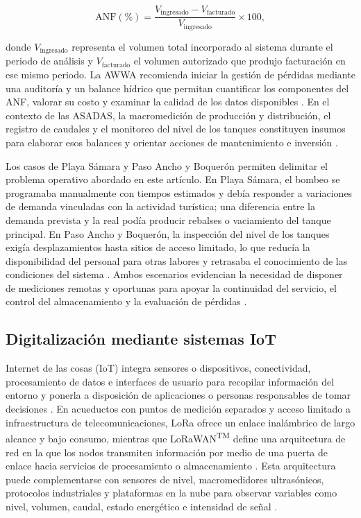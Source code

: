 \documentclass[12pt,letterpaper]{article}
\begin{document}
\begin{equation}
  \mathrm{ANF}(\%)=\frac{V_{\text{ingresado}}-V_{\text{facturado}}}{V_{\text{ingresado}}}\times 100,
  \label{eq:anf}
\end{equation}

donde $V_{\text{ingresado}}$ representa el volumen total incorporado al sistema durante el periodo de análisis y $V_{\text{facturado}}$ el volumen autorizado que produjo facturación en ese mismo periodo. La AWWA recomienda iniciar la gestión de pérdidas mediante una auditoría y un balance hídrico que permitan cuantificar los componentes del ANF, valorar su costo y examinar la calidad de los datos disponibles \cite{kunkel2016}. En el contexto de las ASADAS, la macromedición de producción y distribución, el registro de caudales y el monitoreo del nivel de los tanques constituyen insumos para elaborar esos balances y orientar acciones de mantenimiento e inversión \cite{ayapnud2017,solorzano2021,oviedo2024}.

Los casos de Playa Sámara y Paso Ancho y Boquerón permiten delimitar el problema operativo abordado en este artículo. En Playa Sámara, el bombeo se programaba manualmente con tiempos estimados y debía responder a variaciones de demanda vinculadas con la actividad turística; una diferencia entre la demanda prevista y la real podía producir rebalses o vaciamiento del tanque principal. En Paso Ancho y Boquerón, la inspección del nivel de los tanques exigía desplazamientos hasta sitios de acceso limitado, lo que reducía la disponibilidad del personal para otras labores y retrasaba el conocimiento de las condiciones del sistema \cite{solorzano2021,oviedo2024}. Ambos escenarios evidencian la necesidad de disponer de mediciones remotas y oportunas para apoyar la continuidad del servicio, el control del almacenamiento y la evaluación de pérdidas \cite{solorzano2021,oviedo2024}.

\subsection{Digitalización mediante sistemas IoT}
Internet de las cosas (IoT) integra sensores o dispositivos, conectividad, procesamiento de datos e interfaces de usuario para recopilar información del entorno y ponerla a disposición de aplicaciones o personas responsables de tomar decisiones \cite{rose2015}. En acueductos con puntos de medición separados y acceso limitado a infraestructura de telecomunicaciones, LoRa ofrece un enlace inalámbrico de largo alcance y bajo consumo, mientras que LoRaWAN\textsuperscript{TM} define una arquitectura de red en la que los nodos transmiten información por medio de una puerta de enlace hacia servicios de procesamiento o almacenamiento \cite{lora2015}. Esta arquitectura puede complementarse con sensores de nivel, macromedidores ultrasónicos, protocolos industriales y plataformas en la nube para observar variables como nivel, volumen, caudal, estado energético e intensidad de señal \cite{arad2020,solorzano2021,oviedo2024}.
\end{document}
